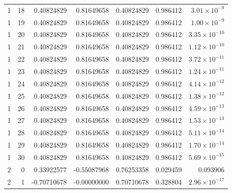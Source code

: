 \documentclass[11pt]{article}
\begin{document}
{\begin{longtable}{rrrrrrr}
1 & 18 & 0.40824829 & 0.81649658 & 0.40824829 & 0.986412 & $3.01\times10^{-9}$ \\
1 & 19 & 0.40824829 & 0.81649658 & 0.40824829 & 0.986412 & $1.00\times10^{-9}$ \\
1 & 20 & 0.40824829 & 0.81649658 & 0.40824829 & 0.986412 & $3.35\times10^{-10}$ \\
1 & 21 & 0.40824829 & 0.81649658 & 0.40824829 & 0.986412 & $1.12\times10^{-10}$ \\
1 & 22 & 0.40824829 & 0.81649658 & 0.40824829 & 0.986412 & $3.72\times10^{-11}$ \\
1 & 23 & 0.40824829 & 0.81649658 & 0.40824829 & 0.986412 & $1.24\times10^{-11}$ \\
1 & 24 & 0.40824829 & 0.81649658 & 0.40824829 & 0.986412 & $4.14\times10^{-12}$ \\
1 & 25 & 0.40824829 & 0.81649658 & 0.40824829 & 0.986412 & $1.38\times10^{-12}$ \\
1 & 26 & 0.40824829 & 0.81649658 & 0.40824829 & 0.986412 & $4.59\times10^{-13}$ \\
1 & 27 & 0.40824829 & 0.81649658 & 0.40824829 & 0.986412 & $1.53\times10^{-13}$ \\
1 & 28 & 0.40824829 & 0.81649658 & 0.40824829 & 0.986412 & $5.11\times10^{-14}$ \\
1 & 29 & 0.40824829 & 0.81649658 & 0.40824829 & 0.986412 & $1.70\times10^{-14}$ \\
1 & 30 & 0.40824829 & 0.81649658 & 0.40824829 & 0.986412 & $5.69\times10^{-15}$ \\
2 & 0 & 0.33922577 & -0.55087968 & 0.76253358 & 0.029459 & 0.093906 \\
2 & 1 & -0.70710678 & -0.00000000 & 0.70710678 & 0.328804 & $2.96\times10^{-17}$ \\
\bottomrule
\end{longtable}
}
\end{document}
